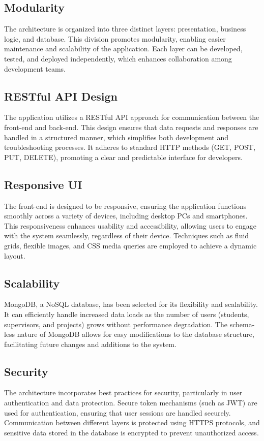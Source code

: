 \documentclass{FastFyp}
\begin{document}
\subsection{Modularity}
The architecture is organized into three distinct layers: presentation, business logic, and database. 
This division promotes modularity, enabling easier maintenance and scalability of the application. 
Each layer can be developed, tested, and deployed independently, which enhances collaboration among development teams.

\subsection{RESTful API Design}
The application utilizes a RESTful API approach for communication between the front-end and back-end.
This design ensures that data requests and responses are handled in a structured manner, which simplifies both development and troubleshooting processes.
It adheres to standard HTTP methods (GET, POST, PUT, DELETE), promoting a clear and predictable interface for developers.

\subsection{Responsive UI}
The front-end is designed to be responsive, ensuring the application functions smoothly across a variety of devices, including desktop PCs and smartphones.
This responsiveness enhances usability and accessibility, allowing users to engage with the system seamlessly, regardless of their device.
Techniques such as fluid grids, flexible images, and CSS media queries are employed to achieve a dynamic layout.

\subsection{Scalability}
MongoDB, a NoSQL database, has been selected for its flexibility and scalability.
It can efficiently handle increased data loads as the number of users (students, supervisors, and projects) grows without performance degradation.
The schema-less nature of MongoDB allows for easy modifications to the database structure, facilitating future changes and additions to the system.

\subsection{Security}
The architecture incorporates best practices for security, particularly in user authentication and data protection.
Secure token mechanisms (such as JWT) are used for authentication, ensuring that user sessions are handled securely.
Communication between different layers is protected using HTTPS protocols, and sensitive data stored in the database is encrypted to prevent unauthorized access.
\end{document}
